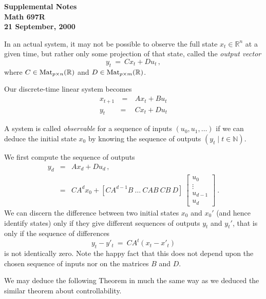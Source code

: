 \documentclass[12pt]{amsart}
\begin{document}
\begin{center}
\Large\bf Supplemental Notes\\
Math 697R\\
21 September, 2000
\end{center}

In an actual system, it may not be possible to 
observe the full state $x_t\in{\mathbb R}^n$ at a given time,
but rather only some projection of that state, called the 
{\it output vector}
$$
  y_t\ =\ Cx_t+Du_t\,,
$$
where $C\in\mbox{\rm Mat}_{p\times n}({\mathbb R})$ and 
$D\in\mbox{\rm Mat}_{p\times m}({\mathbb R})$.

Our discrete-time linear system becomes
%
 \begin{equation}\label{system}
  \begin{array}{rcl}
    x_{t+1}&\ =\ & A x_t + B u_t\\
    y_t & = & C x_t + D u_t
  \end{array}
 \end{equation}
%

A system is called {\it observable} for a sequence of inputs
$(u_0,u_1,\ldots)$ if we can deduce the initial state 
$x_0$ by knowing the sequence of outputs
$(y_t\mid t\in{\mathbb N})$.

We first compute the sequence of outputs
%
\begin{eqnarray*}
  y_d &=& A x_d + D u_d\,,\\
      &=& CA^d x_0 + [CA^{d-1}B\ \ldots\ CAB\ CB\ D]\ 
           \left[\begin{array}{c} u_0\\\vdots\\ 
                  u_{d-1}\\ u_d\end{array}\right]\ .
\end{eqnarray*}
%
We can discern the difference between two initial states
$x_0$ and $x_0'$ (and hence identify states) only if they 
give different sequences of outputs $y_t$ and $y_t'$, 
that is only if the sequence of differences
$$
  y_t-y'_t\ =\ CA^t(x_t-x'_t)
$$ 
is not identically zero.
Note the happy fact that this does not depend upon the chosen
sequence of inputs nor on the matrices $B$ and $D$.


We may deduce the following Theorem in much the same way as we deduced
the similar theorem about controllability.
\medskip
\end{document}
